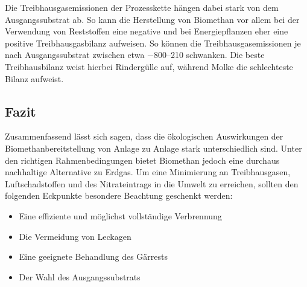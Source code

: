 Die Treibhausgasemissionen der Prozesskette hängen dabei stark von dem Ausgangssubstrat ab. So kann die Herstellung von Biomethan vor allem bei der Verwendung von Reststoffen eine negative und bei Energiepflanzen eher eine positive Treibhausgasbilanz aufweisen. So können die Treibhausgasemissionen je nach Ausgangssubstrat zwischen etwa \SIrange{-800}{210}{\gcoeqmj} schwanken. Die beste Treibhausbilanz weist hierbei Rindergülle auf, während Molke die schlechteste Bilanz aufweist. \parencite{Tonini2016}


\subsection{Fazit}

Zusammenfassend lässt sich sagen, dass die ökologischen Auswirkungen der Biomethanbereitstellung von Anlage zu Anlage stark unterschiedlich sind. Unter den richtigen Rahmenbedingungen bietet Biomethan jedoch eine durchaus nachhaltige Alternative zu Erdgas. Um eine Minimierung an Treibhausgasen, Luftschadstoffen und des Nitrateintrags in die Umwelt zu erreichen, sollten den folgenden Eckpunkte besondere Beachtung geschenkt werden:

\begin{itemize}
	\item Eine effiziente und möglichst vollständige Verbrennung
	\item Die Vermeidung von Leckagen
	\item Eine geeignete Behandlung des Gärrests
	\item Der Wahl des Ausgangssubstrats
\end{itemize}